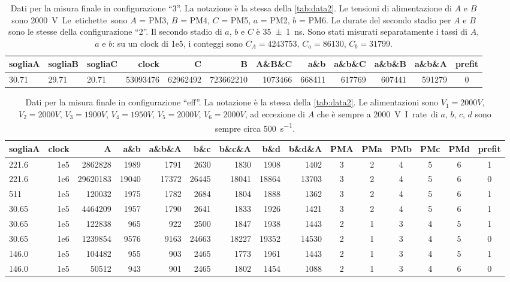 \begin{table}[p]
	\small
	\hspace{-9em}
	\begin{tabular}{lll|rrrrrrrr|c}
		sogliaA & sogliaB & sogliaC & clock & C & B & A\&B\&C & a\&b & a\&b\&C & a\&b\&B & a\&b\&A & prefit \\
		\hline
		30.71 & 29.71 & 20.71 & 53093476 & 62962492 & 723662210 & 1073466 & 668411 & 617769 & 607441 & 591279 & 0
	\end{tabular}
	\caption{\label{tab:data3}
	Dati per la misura finale in configurazione ``3''.
	La notazione è la stessa della \autoref{tab:data2}.
	Le tensioni di alimentazione di $A$ e $B$ sono \SI{2000}V.
	Le etichette sono $A$ = PM3, $B$ = PM4, $C$ = PM5, $a$ = PM2, $b$ = PM6.
	Le durate del secondo stadio per $A$ e $B$ sono le stesse della configurazione ``2''.
	Il secondo stadio di $a$, $b$ e $C$ è \SI{35\pm1}{ns}.
	Sono stati misurati separatamente i tassi di $A$, $a$ e $b$:
	su un clock di 1e5, i conteggi sono $C_A=4243753$, $C_a=86130$, $C_b=31799$.}
\end{table}

\begin{table}[p]
	\small
	\hspace{-10.5em}
	\begin{tabular}{l|rrrrrrrr|ccccc|c}
		sogliaA & clock & A &a\&b & a\&b\&A & b\&c & b\&c\&A & b\&d & b\&d\&A & PMA & PMa & PMb & PMc & PMd & prefit \\
		\hline\hline
		221.6 & 1e5   & 2862828 & 1989 & 1791 & 2630 & 1830 & 1908 & 1402 & 3 & 2 & 4 & 5 & 6 & 1           \\
		221.6 & 1e6   & 29620183 & 19040 & 17372 & 26445 & 18041 & 18864 & 13703 & 3 & 2 & 4 & 5 & 6 & 0     \\
		511 & 1e5 & 120032 & 1975 & 1782 & 2684 & 1804 & 1888 & 1362 & 3 & 2 & 4 & 5 & 6 & 1         \\
		30.65 & 1e5  & 4464209 & 1957 & 1790 & 2641 & 1833 & 1926 & 1421 & 3 & 2 & 4 & 5 & 6 & 1          \\
		\hline
		30.65 & 1e5  & 122838 & 965 & 922 & 2500 & 1847 & 1938 & 1443 & 2 & 1 & 3 & 4 & 5 & 1            \\
		30.65 & 1e6  & 1239854 & 9576 & 9163 & 24663 & 18227 & 19352 & 14530 & 2 & 1 & 3 & 4 & 5 & 0      \\
		146.0 & 1e5   & 104482 & 955 & 903 & 2465 & 1773 & 1961 & 1443 & 2 & 1 & 3 & 4 & 5 & 1             \\
		\hline
		146.0 & 1e5   & 50512 & 943 & 901 & 2465 & 1802 & 1454 & 1088 & 2 & 1 & 3 & 4 & 6 & 0             
	\end{tabular}
	\caption{\label{tab:dataeff}
	Dati per la misura finale in configurazione ``eff''.
	La notazione è la stessa della \autoref{tab:data2}.
	Le alimentazioni sono
	$V_1=\SI{2000}V$, $V_2=\SI{2000}V$, $V_3=\SI{1900}V$, $V_4=\SI{1950}V$, $V_5=\SI{2000}V$, $V_6=\SI{2000}V$,
	ad eccezione di $A$ che è sempre a \SI{2000}V.
	I~rate di $a$, $b$, $c$, $d$ sono sempre circa \SI{500}{s^{-1}}.}
\end{table}
